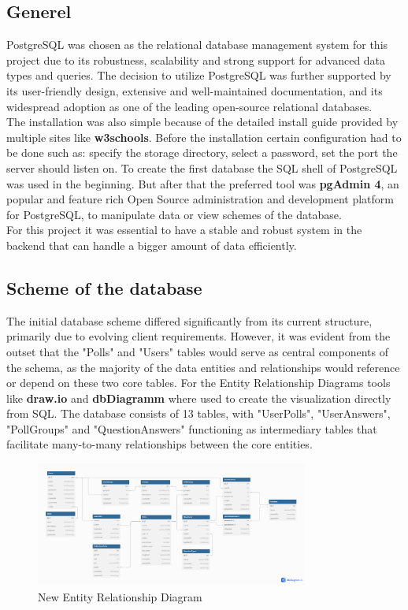\documentclass[a4paper,12pt]{report}
\begin{document}
\subsection{Generel}
PostgreSQL was chosen as the relational database management system for this project due to its robustness, scalability and strong support for advanced data types and queries. The decision to utilize PostgreSQL was further supported by its user-friendly design, extensive and well-maintained documentation, and its widespread adoption as one of the leading open-source relational databases.\\
The installation was also simple because of the detailed install guide provided by multiple sites like \textbf{w3schools}. Before the installation certain configuration had to be done such as: specify the storage directory, select a password, set the port the server should listen on. To create the first database the SQL shell of PostgreSQL was used in the beginning. But after that the preferred tool was \textbf{pgAdmin 4}, an popular and feature rich Open Source administration and development platform for PostgreSQL, to manipulate data or view schemes of the database.\parencite{pgsinstallation}\\
For this project it was essential to have a stable and robust system in the backend that can handle a bigger amount of data efficiently. 
\subsection{Scheme of the database}
The initial database scheme differed significantly from its current structure, primarily due to evolving client requirements. However, it was evident from the outset that the "Polls" and "Users" tables would serve as central components of the schema, as the majority of the data entities and relationships would reference or depend on these two core tables. For the Entity Relationship Diagrams tools like \textbf{draw.io} and \textbf{dbDiagramm} where used to create the visualization directly from SQL.
The database consists of 13 tables, with "UserPolls", "UserAnswers", "PollGroups" and "QuestionAnswers" functioning as intermediary tables that facilitate many-to-many relationships between the core entities. 
\begin{figure}[H]	
	\centering	
	\includegraphics[width=0.8\textwidth]{pics/new_ERD.png}	
	\caption{New Entity Relationship Diagram}	
	\label{fig:new_ERD}
\end{figure}
\end{document}
